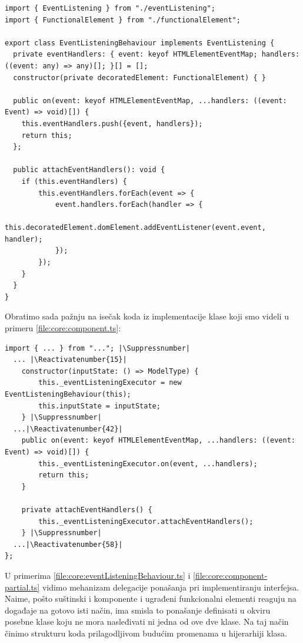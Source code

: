 \documentclass[12pt,oneside]{memoir}
\makeatletter
\newcommand{\code}[1]{\allowbreak{\colorbox{codegray}{\texttt{\scalebox{0.9}{#1}}}}}%
\let\origthelstnumber\thelstnumber
\newcommand*\Suppressnumber{%
  \lst@AddToHook{OnNewLine}{%
    \let\thelstnumber\relax%
     \advance\c@lstnumber-\@ne\relax%
    }%
}
\newcommand*\Reactivatenumber[1]{%
  \setcounter{lstnumber}{\numexpr#1-1\relax}
  \lst@AddToHook{OnNewLine}{%
   \let\thelstnumber\origthelstnumber%
   \refstepcounter{lstnumber}
  }%
}
\makeatother
\begin{document}
\begin{lstlisting}[style=jsStyle, escapeinside=\#\#, caption={Fajl \code{core/eventListeningBehaviour.ts}},label=file:core:eventListeningBehaviour.ts]
import { EventListening } from "./eventListening";
import { FunctionalElement } from "./functionalElement";

export class EventListeningBehaviour implements EventListening {
  private eventHandlers: { event: keyof HTMLElementEventMap; handlers: ((event: any) => any)[]; }[] = [];
  constructor(private decoratedElement: FunctionalElement) { }

  public on(event: keyof HTMLElementEventMap, ...handlers: ((event: Event) => void)[]) {
    this.eventHandlers.push({event, handlers});
    return this;
  };

  public attachEventHandlers(): void {
    if (this.eventHandlers) {
        this.eventHandlers.forEach(event => {
            event.handlers.forEach(handler => {
              this.decoratedElement.domElement.addEventListener(event.event, handler);
            });
        });
    }
  }
}
\end{lstlisting}
Obratimo sada pažnju na isečak koda iz implementacije klase \code{Component<T>} koji smo videli u primeru \ref{file:core:component.ts}:
\begin{lstlisting}[style=jsStyle, caption={Isečak koda iz fajla \code{core/component.ts}},label=file:core:component-partial.ts]
import { ... } from "..."; |\Suppressnumber|
  ... |\Reactivatenumber{15}|
    constructor(inputState: () => ModelType) {
        this._eventListeningExecutor = new EventListeningBehaviour(this);
        this.inputState = inputState;
    } |\Suppressnumber|
  ...|\Reactivatenumber{42}|
    public on(event: keyof HTMLElementEventMap, ...handlers: ((event: Event) => void)[]) {
        this._eventListeningExecutor.on(event, ...handlers);
        return this;
    }

    private attachEventHandlers() {
        this._eventListeningExecutor.attachEventHandlers();
    } |\Suppressnumber|
  ...|\Reactivatenumber{58}|
};

\end{lstlisting}
U primerima \ref{file:core:eventListeningBehaviour.ts} i \ref{file:core:component-partial.ts}
vidimo mehanizam delegacije ponašanja pri implementiranju interfejsa.
Naime, pošto suštinski i komponente i ugrađeni funkcionalni elementi reaguju na događaje na gotovo isti način,
ima smisla to ponašanje definisati u okviru posebne klase koju ne mora nasleđivati ni jedna od ove dve klase.
Na taj način činimo strukturu koda prilagodljivom budućim promenama u hijerarhiji klasa.
\end{document}
